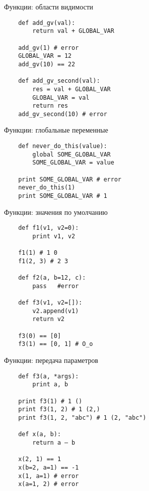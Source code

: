 \documentclass{article}
\begin{document}
\begin{center} Функции: области видимости \end{center}
\vspace{15pt}
\begin{lstlisting}
    def add_gv(val):
        return val + GLOBAL_VAR

    add_gv(1) # error
    GLOBAL_VAR = 12
    add_gv(10) == 22

    def add_gv_second(val):
        res = val + GLOBAL_VAR
        GLOBAL_VAR = val
        return res
    add_gv_second(10) # error
\end{lstlisting}
\newpage

\begin{center} Функции: глобальные переменные \end{center}
\vspace{15pt}
\begin{lstlisting}
    def never_do_this(value):
        global SOME_GLOBAL_VAR
        SOME_GLOBAL_VAR = value

    print SOME_GLOBAL_VAR # error
    never_do_this(1)
    print SOME_GLOBAL_VAR # 1
\end{lstlisting}
\newpage

\begin{center} Функции: значения по умолчанию \end{center}
\vspace{15pt}
\begin{lstlisting}
    def f1(v1, v2=0):
        print v1, v2

    f1(1) # 1 0
    f1(2, 3) # 2 3

    def f2(a, b=12, c):
        pass   #error

    def f3(v1, v2=[]):
        v2.append(v1)
        return v2

    f3(0) == [0]
    f3(1) == [0, 1] # O_o
\end{lstlisting}
\newpage

\begin{center} Функции: передача параметров \end{center}
\vspace{15pt}
\begin{lstlisting}
    def f3(a, *args):
        print a, b

    print f3(1) # 1 ()
    print f3(1, 2) # 1 (2,)
    print f3(1, 2, "abc") # 1 (2, "abc")

    def x(a, b):
        return a – b

    x(2, 1) == 1
    x(b=2, a=1) == -1
    x(1, a=1) # error
    x(a=1, 2) # error
\end{lstlisting}
\newpage
\end{document}
